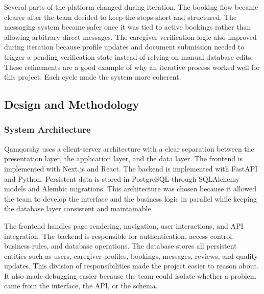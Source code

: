\documentclass[12pt,a4paper]{article}
\begin{document}
Several parts of the platform changed during iteration. The booking flow became clearer after the team decided to keep the steps short and structured. The messaging system became safer once it was tied to active bookings rather than allowing arbitrary direct messages. The caregiver verification logic also improved during iteration because profile updates and document submission needed to trigger a pending verification state instead of relying on manual database edits. These refinements are a good example of why an iterative process worked well for this project. Each cycle made the system more coherent.

\subsection{Design and Methodology}

\subsubsection{System Architecture}

Qamqorshy uses a client-server architecture with a clear separation between the presentation layer, the application layer, and the data layer. The frontend is implemented with Next.js and React. The backend is implemented with FastAPI and Python. Persistent data is stored in PostgreSQL through SQLAlchemy models and Alembic migrations. This architecture was chosen because it allowed the team to develop the interface and the business logic in parallel while keeping the database layer consistent and maintainable.

The frontend handles page rendering, navigation, user interactions, and API integration. The backend is responsible for authentication, access control, business rules, and database operations. The database stores all persistent entities such as users, caregiver profiles, bookings, messages, reviews, and quality updates. This division of responsibilities made the project easier to reason about. It also made debugging easier because the team could isolate whether a problem came from the interface, the API, or the schema.
\end{document}
